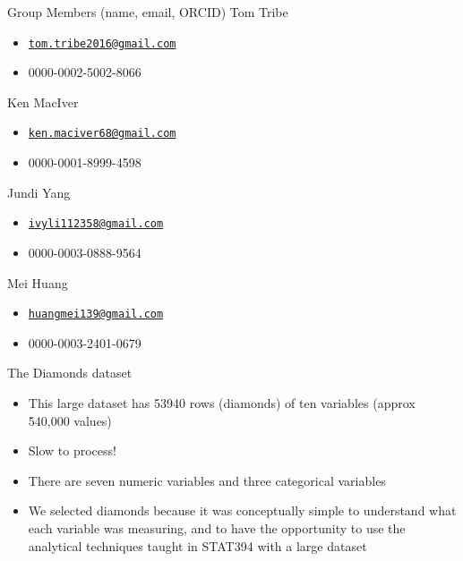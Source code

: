 \documentclass[
  ignorenonframetext,
]{beamer}
\providecommand{\tightlist}{%
  \setlength{\itemsep}{0pt}\setlength{\parskip}{0pt}}
\begin{document}
\begin{frame}{Group Members (name, email, ORCID)}
\protect\hypertarget{group-members-name-email-orcid}{}
Tom Tribe

\begin{itemize}
\tightlist
\item
  \href{mailto:tom.tribe2016@gmail.com}{\nolinkurl{tom.tribe2016@gmail.com}}
\item
  0000-0002-5002-8066
\end{itemize}

Ken MacIver

\begin{itemize}
\tightlist
\item
  \href{mailto:ken.maciver68@gmail.com}{\nolinkurl{ken.maciver68@gmail.com}}
\item
  0000-0001-8999-4598
\end{itemize}

Jundi Yang

\begin{itemize}
\tightlist
\item
  \href{mailto:ivyli112358@gmail.com}{\nolinkurl{ivyli112358@gmail.com}}
\item
  0000-0003-0888-9564
\end{itemize}

Mei Huang

\begin{itemize}
\tightlist
\item
  \href{mailto:huangmei139@gmail.com}{\nolinkurl{huangmei139@gmail.com}}
\item
  0000-0003-2401-0679
\end{itemize}
\end{frame}

\begin{frame}{The Diamonds dataset}
\protect\hypertarget{the-diamonds-dataset}{}
\begin{itemize}
\tightlist
\item
  This large dataset has 53940 rows (diamonds) of ten variables (approx
  540,000 values)\linebreak 
\item
  Slow to process!\linebreak
\item
  There are seven numeric variables and three categorical
  variables\linebreak
\item
  We selected diamonds because it was conceptually simple to understand
  what each variable was measuring, and to have the opportunity to use
  the analytical techniques taught in STAT394 with a large
  dataset\linebreak
\end{itemize}
\end{frame}
\end{document}
